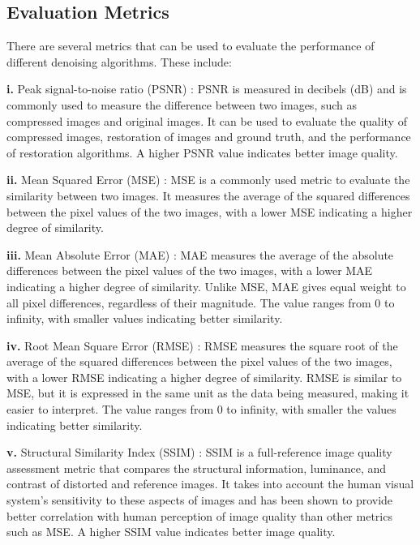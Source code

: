 \documentclass[conference]{IEEEtran}
\begin{document}
\subsection{Evaluation Metrics}
\noindent There are several metrics that can be used to evaluate the performance of different denoising algorithms. These include:

{\bf i.} Peak signal-to-noise ratio (PSNR) \cite{hore2010image}: PSNR is measured in decibels (dB) and is commonly used to measure the difference between two images, such as compressed images and original images. It can be used to evaluate the quality of compressed images, restoration of images and ground truth, and the performance of restoration algorithms. A higher PSNR value indicates better image quality.

{\bf ii.} Mean Squared Error (MSE) \cite{wallach1989mean}: MSE is a commonly used metric to evaluate the similarity between two images. It measures the average of the squared differences between the pixel values of the two images, with a lower MSE indicating a higher degree of similarity.

{\bf iii.} Mean Absolute Error (MAE) \cite{willmott2005advantages}: MAE measures the average of the absolute differences between the pixel values of the two images, with a lower MAE indicating a higher degree of similarity. Unlike MSE, MAE gives equal weight to all pixel differences, regardless of their magnitude. The value ranges from 0 to infinity, with smaller values indicating better similarity.

{\bf iv.} Root Mean Square Error (RMSE) \cite{willmott2005advantages}: RMSE measures the square root of the average of the squared differences between the pixel values of the two images, with a lower RMSE indicating a higher degree of similarity. RMSE is similar to MSE, but it is expressed in the same unit as the data being measured, making it easier to interpret. The value ranges from 0 to infinity, with smaller the values indicating better similarity.

{\bf v.} Structural Similarity Index (SSIM) \cite{hore2010image}: SSIM is a full-reference image quality assessment metric that compares the structural information, luminance, and contrast of distorted and reference images. It takes into account the human visual system's sensitivity to these aspects of images and has been shown to provide better correlation with human perception of image quality than other metrics such as MSE. A higher SSIM value indicates better image quality.
\end{document}
